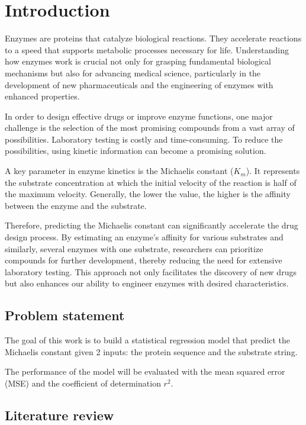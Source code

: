 
\chapter{Introduction}
\label{chap:1}

Enzymes are proteins that catalyze biological reactions. They accelerate reactions 
to a speed that supports metabolic processes necessary for life. 
Understanding how enzymes work is crucial not only for grasping fundamental 
biological mechanisms but also for advancing medical science, 
particularly in the development of new pharmaceuticals and the engineering 
of enzymes with enhanced properties.

In order to design effective drugs or improve enzyme functions, 
one major challenge is the selection of the most promising compounds 
from a vast array of possibilities. 
Laboratory testing is costly and time-consuming. To reduce the possibilities,
using kinetic information can become a promising solution.

A key parameter in enzyme kinetics is the Michaelis constant ($K_m$). It represents
the substrate concentration at which the initial velocity of the reaction is half of
the maximum velocity. Generally, the lower the value, the higher is the affinity 
between the enzyme and the substrate.

Therefore, predicting the Michaelis constant can significantly accelerate the drug design process. 
By estimating an enzyme's affinity for various substrates and similarly, several enzymes
with one substrate, researchers can prioritize compounds for further development, 
thereby reducing the need for extensive laboratory testing. 
This approach not only facilitates the discovery of new drugs but also enhances 
our ability to engineer enzymes with desired characteristics.

\section{Problem statement}

The goal of this work is to build a statistical regression model that predict the 
Michaelis constant given 2 inputs: the protein sequence and the substrate string. 

The performance of the model will be evaluated with the mean squared error (MSE) and 
the coefficient of determination $r^2$.

\section{Literature review}

